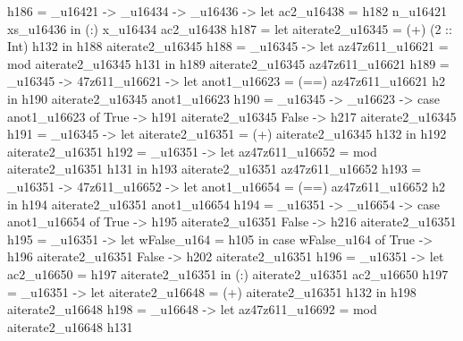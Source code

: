          h186 = \n_u16421 -> \x_u16434 -> \xs_u16436 -> let
                                                          ac2_u16438 = h182 n_u16421 xs_u16436
                                                        in (:) x_u16434 ac2_u16438
         h187 = let aiterate2_u16345 = (+) (2 :: Int) h132
                in h188 aiterate2_u16345
         h188 = _u16345 -> let
                                       az47z611_u16621 = mod aiterate2_u16345 h131
                                     in h189 aiterate2_u16345 az47z611_u16621
         h189 = _u16345 -> \az47z611_u16621 -> let
                                                           anot1_u16623 = (==) az47z611_u16621 h2
                                                         in h190 aiterate2_u16345 anot1_u16623
         h190 = _u16345 -> _u16623 -> case anot1_u16623 of
                                                        True -> h191 aiterate2_u16345
                                                        False -> h217 aiterate2_u16345
         h191 = _u16345 -> let
                                       aiterate2_u16351 = (+) aiterate2_u16345 h132
                                     in h192 aiterate2_u16351
         h192 = _u16351 -> let
                                       az47z611_u16652 = mod aiterate2_u16351 h131
                                     in h193 aiterate2_u16351 az47z611_u16652
         h193 = _u16351 -> \az47z611_u16652 -> let
                                                           anot1_u16654 = (==) az47z611_u16652 h2
                                                         in h194 aiterate2_u16351 anot1_u16654
         h194 = _u16351 -> _u16654 -> case anot1_u16654 of
                                                        True -> h195 aiterate2_u16351
                                                        False -> h216 aiterate2_u16351
         h195 = _u16351 -> let wFalse_u164 = h105
                                     in case wFalse_u164 of
                                          True -> h196 aiterate2_u16351
                                          False -> h202 aiterate2_u16351
         h196 = _u16351 -> let ac2_u16650 = h197 aiterate2_u16351
                                     in (:) aiterate2_u16351 ac2_u16650
         h197 = _u16351 -> let
                                       aiterate2_u16648 = (+) aiterate2_u16351 h132
                                     in h198 aiterate2_u16648
         h198 = _u16648 -> let
                                       az47z611_u16692 = mod aiterate2_u16648 h131

